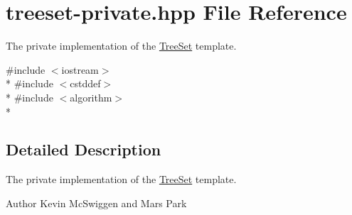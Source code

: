 \hypertarget{treeset-private_8hpp}{\section{treeset-\/private.hpp File Reference}
\label{treeset-private_8hpp}
}


The private implementation of the \hyperlink{class_tree_set}{Tree\-Set} template.  


{\ttfamily \#include $<$iostream$>$}\\*
{\ttfamily \#include $<$cstddef$>$}\\*
{\ttfamily \#include $<$algorithm$>$}\\*


\subsection{Detailed Description}
The private implementation of the \hyperlink{class_tree_set}{Tree\-Set} template. \begin{DoxyAuthor}{Author}
Kevin Mc\-Swiggen and Mars Park 
\end{DoxyAuthor}

